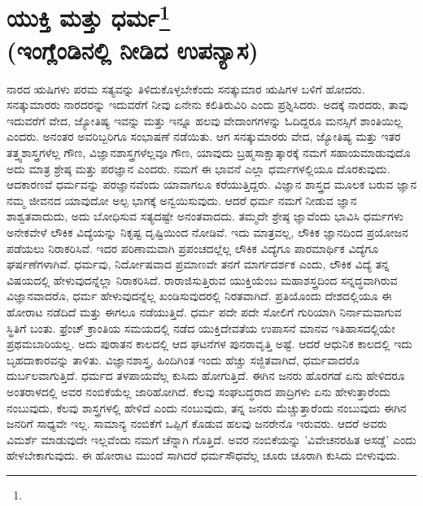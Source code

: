 
\chapter{ಯುಕ್ತಿ ಮತ್ತು ಧರ್ಮ\protect\footnote{}\\(ಇಂಗ್ಲೆಂಡಿನಲ್ಲಿ ನೀಡಿದ ಉಪನ್ಯಾಸ)}

ನಾರದ ಋಷಿಗಳು ಪರಮ ಸತ್ಯವನ್ನು ತಿಳಿದುಕೊಳ್ಳಬೇಕೆಂದು ಸನತ್ಕುಮಾರ ಋಷಿಗಳ ಬಳಿಗೆ ಹೋದರು. ಸನತ್ಕುಮಾರರು ನಾರದರನ್ನು ಇದುವರೆಗೆ ನೀವು ಏನೇನು ಕಲಿತಿರುವಿರಿ ಎಂದು ಪ್ರಶ್ನಿಸಿದರು. ಅದಕ್ಕೆ ನಾರದರು, ತಾವು ಇದುವರೆಗೆ ವೇದ, ಜ್ಯೋತಿಷ್ಯ ಇವನ್ನು ಮತ್ತು ಇನ್ನೂ ಹಲವು ವೇದಾಂಗಗಳನ್ನು ಓದಿದ್ದರೂ ಮನಸ್ಸಿಗೆ ಶಾಂತಿಯಿಲ್ಲ ಎಂದರು. ಅನಂತರ ಅವರಿಬ್ಬರಿಗೂ ಸಂಭಾಷಣೆ ನಡೆಯಿತು. ಆಗ ಸನತ್ಕುಮಾರರು ವೇದ, ಜ್ಯೋತಿಷ್ಯ ಮತ್ತು ಇತರ ತತ್ತ್ವಶಾಸ್ತ್ರಗಳೆಲ್ಲ ಗೌಣ, ವಿಜ್ಞಾನಶಾಸ್ತ್ರಗಳೆಲ್ಲವೂ ಗೌಣ, ಯಾವುದು ಬ್ರಹ್ಮಸಾಕ್ಷಾತ್ಕಾರಕ್ಕೆ ನಮಗೆ ಸಹಾಯಮಾಡುವುದೊ ಅದು ಮಾತ್ರ ಶ್ರೇಷ್ಠ ಮತ್ತು ಪರಜ್ಞಾನ ಎಂದರು. ನಮಗೆ ಈ ಭಾವನೆ ಎಲ್ಲಾ ಧರ್ಮಗಳಲ್ಲಿಯೂ ದೊರಕುವುದು. ಆದಕಾರಣವೆ ಧರ್ಮವನ್ನು ಪರಜ್ಞಾನವೆಂದು ಯಾವಾಗಲೂ ಕರೆಯುತ್ತಿದ್ದರು. ವಿಜ್ಞಾನ ಶಾಸ್ತ್ರದ ಮೂಲಕ ಬರುವ ಜ್ಞಾನ ನಮ್ಮ ಜೀವನದ ಯಾವುದೋ ಅಲ್ಪ ಭಾಗಕ್ಕೆ ಅನ್ವಯಿಸುವುದು. ಆದರೆ ಧರ್ಮ ನಮಗೆ ನೀಡುವ ಜ್ಞಾನ ಶಾಶ್ವತವಾದುದು, ಅದು ಬೋಧಿಸುವ ಸತ್ಯದಷ್ಟೇ ಅನಂತವಾದದು. ತಮ್ಮದೇ ಶ್ರೇಷ್ಠ ಜ್ಞಾವೆಂದು ಭಾವಿಸಿ ಧರ್ಮಗಳು ಅನೇಕವೇಳೆ ಲೌಕಿಕ ವಿದ್ಯೆಯನ್ನು ನಿಕೃಷ್ಟ ದೃಷ್ಟಿಯಿಂದ ನೋಡಿವೆ. ಇದು ಮಾತ್ರವಲ್ಲ, ಲೌಕಿಕ ಜ್ಞಾನದಿಂದ ಪ್ರಯೋಜನ ಪಡೆಯಲು ನಿರಾಕರಿಸಿವೆ. ಇದರ ಪರಿಣಾಮವಾಗಿ ಪ್ರಪಂಚದಲ್ಲೆಲ್ಲ ಲೌಕಿಕ ವಿದ್ಯೆಗೂ ಪಾರಮಾರ್ಥಿಕ ವಿದ್ಯೆಗೂ ಘರ್ಷಣೆಗಳಾಗಿವೆ. ಧರ್ಮವು, ನಿರ್ದೋಷವಾದ ಪ್ರಮಾಣವೇ ತನಗೆ ಮಾರ್ಗದರ್ಶಕ ಎಂದು, ಲೌಕಿಕ ವಿದ್ಯೆ ತನ್ನ ವಿಷಯದಲ್ಲಿ ಹೇಳುವುದನ್ನೆಲ್ಲಾ ನಿರಾಕರಿಸಿದೆ. ರಾರಾಜಿಸುತ್ತಿರುವ ಯುಕ್ತಿಯೆಂಬ ಮಹಾಶಸ್ತ್ರದಿಂದ ಸನ್ನದ್ಧವಾಗಿರುವ ವಿಜ್ಞಾನವಾದರೊ, ಧರ್ಮ ಹೇಳುವುದನ್ನೆಲ್ಲ ಖಂಡಿಸುವುದರಲ್ಲಿ ನಿರತವಾಗಿದೆ. ಪ್ರತಿಯೊಂದು ದೇಶದಲ್ಲಿಯೂ ಈ ಹೋರಾಟ ನಡೆದಿದೆ ಮತ್ತು ಈಗಲೂ ನಡೆಯುತ್ತಿದೆ. ಧರ್ಮ ಪದೇ ಪದೇ ಸೋಲಿಗೆ ಗುರಿಯಾಗಿ ನಿರ್ನಾಮವಾಗುವ ಸ್ಥಿತಿಗೆ ಬಂತು. ಫ್ರೆಂಚ್ ಕ್ರಾಂತಿಯ ಸಮಯದಲ್ಲಿ ನಡೆದ ಯುಕ್ತಿದೇವತೆಯ ಉಪಾಸನೆ ಮಾನವ ಇತಿಹಾಸದಲ್ಲಿಯೇ ಪ್ರಥಮಬಾರಿಯಲ್ಲ. ಅದು ಪುರಾತನ ಕಾಲದಲ್ಲಿ ಆದ ಘಟನೆಗಳ ಪುನರಾವೃತ್ತಿ ಅಷ್ಟೆ. ಆದರೆ ಆಧುನಿಕ ಕಾಲದಲ್ಲಿ ಇದು ಬೃಹದಾಕಾರವನ್ನು ತಾಳಿತು. ವಿಜ್ಞಾನಶಾಸ್ತ್ರ, ಹಿಂದಿಗಿಂತ ಇಂದು ಹೆಚ್ಚು ಸಜ್ಜಿತವಾಗಿದೆ, ಧರ್ಮವಾದರೊ ದುರ್ಬಲವಾಗುತ್ತಿದೆ. ಧರ್ಮದ ತಳಪಾಯವೆಲ್ಲ ಕುಸಿದು ಹೋಗುತ್ತಿದೆ. ಈಗಿನ ಜನರು ಹೊರಗಡೆ ಏನು ಹೇಳಿದರೂ ಅಂತರಾಳದಲ್ಲಿ ಅವರ ನಂಬಿಕೆಯೆಲ್ಲ ಜಾರಿಹೋಗಿದೆ. ಕೆಲವು ಸಂಘಬದ್ಧರಾದ ಪಾದ್ರಿಗಳು ಏನು ಹೇಳುತ್ತಾರೆಂದು ನಂಬುವುದು, ಕೆಲವು ಶಾಸ್ತ್ರಗಳಲ್ಲಿ ಹೇಳಿದೆ ಎಂದು ನಂಬುವುದು, ತನ್ನ ಜನರು ಮೆಚ್ಚುತ್ತಾರೆಂದು ನಂಬುವುದು ಈಗಿನ ಜನರಿಗೆ ಸಾಧ್ಯವೇ ಇಲ್ಲ. ಸಾಮಾನ್ಯ ನಂಬಿಕೆಗೆ ಒಪ್ಪಿಗೆ ಕೊಡುವ ಹಲವು ಜನರೇನೊ ಇರುವರು. ಆದರೆ ಅವರು ವಿಮರ್ಶೆ ಮಾಡುವುದೇ ಇಲ್ಲವೆಂದು ನಮಗೆ ಚೆನ್ನಾಗಿ ಗೊತ್ತಿದೆ. ಅವರ ನಂಬಿಕೆಯನ್ನು 'ವಿವೇಚನರಹಿತ ಅಸಡ್ಡೆ' ಎಂದು ಹೇಳಬೇಕಾಗುವುದು. ಈ ಹೋರಾಟ ಮುಂದೆ ಸಾಗಿದರೆ ಧರ್ಮಸೌಧವೆಲ್ಲ ಚೂರು ಚೂರಾಗಿ ಕುಸಿದು ಬೀಳುವುದು.

